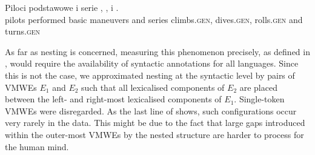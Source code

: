 \documentclass[output=paper,modfonts]{langscibook}
\begin{document}
\ea \label{pl:wykonywac-manewry}
\settowidth {} 
\gll Piloci  podstawowe  i serie , ,  i . \\
pilots performed basic maneuvers and series climbs.\textsc{gen}, dives.\textsc{gen}, rolls.\textsc{gen} and turns.\textsc{gen}\\ 
\glt {}
\z

As far as nesting is concerned, measuring this phenomenon precisely, as defined in , would require the availability of syntactic annotations for all languages. Since this is not the case, we approximated nesting at the syntactic level by pairs of VMWEs $E_1$ and $E_2$ such that all lexicalised components of $E_2$ are placed between the left- and right-most lexicalised components of $E_1$. Single-token VMWEs were disregarded.
As the last line of  shows, such configurations occur very rarely in the data. 
This might be due to the fact that large gaps introduced within the outer-most VMWEs by the nested structure are harder to process for the human mind.
 
\end{document}
